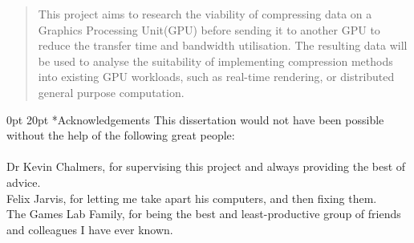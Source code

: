\documentclass[12pt,a4paper]{article}
\makeatletter
\renewcommand\section{\@startsection {section}{1}{0mm} %
                               {0pt} %
                               {20pt} %
                               {\fontsize{14pt}{1em}\bfseries\newpage}}
\makeatother
\begin{document}


\pagebreak

\pagebreak

\begin{abstract}
This project aims to research the viability of compressing data on a Graphics Processing Unit(GPU) before sending it to another GPU to reduce the transfer time and bandwidth utilisation.
The resulting data will be used to analyse the suitability of implementing compression methods into existing GPU workloads, such as real-time rendering, or distributed general purpose computation.
\end{abstract}
\pagebreak

\tableofcontents %
\newpage

\listoftables
\newpage

\listoffigures
\newpage

\section*{Acknowledgements}
This dissertation would not have been possible without the help of the following great people:
\\\\
Dr Kevin Chalmers, for supervising this project and always providing the best of advice.\\
Felix Jarvis, for letting me take apart his computers, and then fixing them.\\
The Games Lab Family, for being the best and least-productive group of friends and colleagues I have ever known.\\

\newpage
\end{document}
